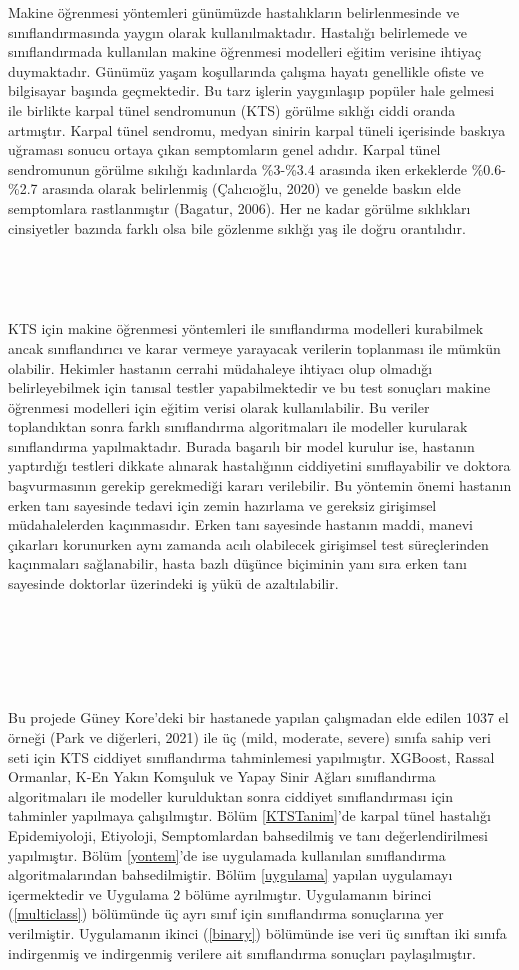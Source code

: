 \documentclass[12pt,twoside]{deuthesis}
\begin{document}
Makine öğrenmesi yöntemleri günümüzde hastalıkların belirlenmesinde ve sınıflandırmasında yaygın olarak kullanılmaktadır. Hastalığı belirlemede ve sınıflandırmada kullanılan makine öğrenmesi modelleri eğitim verisine ihtiyaç duymaktadır. Günümüz yaşam koşullarında çalışma hayatı genellikle ofiste ve bilgisayar başında geçmektedir. Bu tarz işlerin yaygınlaşıp popüler hale gelmesi ile birlikte karpal tünel sendromunun (KTS) görülme sıklığı ciddi oranda artmıştır. Karpal tünel sendromu, medyan sinirin karpal tüneli içerisinde baskıya uğraması sonucu ortaya çıkan semptomların genel adıdır. Karpal tünel sendromunun görülme sıkılığı kadınlarda \%3-\%3.4 arasında iken erkeklerde \%0.6-\%2.7 arasında olarak belirlenmiş (Çalıcıoğlu, 2020) ve genelde baskın elde semptomlara rastlanmıştır (Bagatur, 2006). Her ne kadar görülme sıklıkları cinsiyetler bazında farklı olsa bile gözlenme sıklığı yaş ile doğru orantılıdır.
~

~

~

KTS için makine öğrenmesi yöntemleri ile sınıflandırma modelleri kurabilmek ancak sınıflandırıcı ve karar vermeye yarayacak verilerin toplanması ile mümkün olabilir. Hekimler hastanın cerrahi müdahaleye ihtiyacı olup olmadığı belirleyebilmek için tanısal testler yapabilmektedir ve bu test sonuçları makine öğrenmesi modelleri için eğitim verisi olarak kullanılabilir. Bu veriler toplandıktan sonra farklı sınıflandırma algoritmaları ile modeller kurularak sınıflandırma yapılmaktadır. Burada başarılı bir model kurulur ise, hastanın yaptırdığı testleri dikkate alınarak hastalığının ciddiyetini sınıflayabilir ve doktora başvurmasının gerekip gerekmediği kararı verilebilir. Bu yöntemin önemi hastanın erken tanı sayesinde tedavi için zemin hazırlama ve gereksiz girişimsel müdahalelerden kaçınmasıdır. Erken tanı sayesinde hastanın maddi, manevi çıkarları korunurken aynı zamanda acılı olabilecek girişimsel test süreçlerinden kaçınmaları sağlanabilir, hasta bazlı düşünce biçiminin yanı sıra erken tanı sayesinde doktorlar üzerindeki iş yükü de azaltılabilir.

~

~

~

Bu projede Güney Kore'deki bir hastanede yapılan çalışmadan elde edilen 1037 el örneği (Park ve diğerleri, 2021) ile üç (mild, moderate, severe) sınıfa sahip veri seti için KTS ciddiyet sınıflandırma tahminlemesi yapılmıştır. XGBoost, Rassal Ormanlar, K-En Yakın Komşuluk ve Yapay Sinir Ağları sınıflandırma algoritmaları ile modeller kurulduktan sonra ciddiyet sınıflandırması için tahminler yapılmaya çalışılmıştır. Bölüm \ref{KTSTanim}'de karpal tünel hastalığı Epidemiyoloji, Etiyoloji, Semptomlardan bahsedilmiş ve tanı değerlendirilmesi yapılmıştır. Bölüm \ref{yontem}'de ise uygulamada kullanılan sınıflandırma algoritmalarından bahsedilmiştir. Bölüm \ref{uygulama} yapılan uygulamayı içermektedir ve Uygulama 2 bölüme ayrılmıştır. Uygulamanın birinci (\ref{multiclass}) bölümünde üç ayrı sınıf için sınıflandırma sonuçlarına yer verilmiştir. Uygulamanın ikinci (\ref{binary}) bölümünde ise veri üç sınıftan iki sınıfa indirgenmiş ve indirgenmiş verilere ait sınıflandırma sonuçları paylaşılmıştır.
\end{document}

